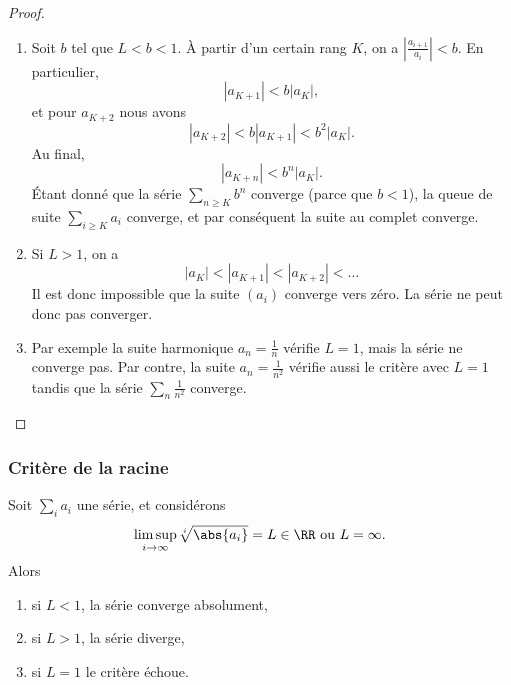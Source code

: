 \begin{proof}
\begin{enumerate}
	\item
		Soit $b$ tel que $L<b<1$. À partir d'un certain rang $K$, on a $\left| \frac{ a_{i+1} }{ a_i } \right| <b$. En particulier,
		\begin{equation}
			| a_{K+1} |<b| a_K |,
		\end{equation}
		et pour $a_{K+2}$ nous avons
		\begin{equation}
			| a_{K+2} |<b| a_{K+1} |<b^2| a_K |.
		\end{equation}
		Au final,
		\begin{equation}
			| a_{K+n} |<b^n| a_K |.
		\end{equation}
		Étant donné que la série $\sum_{n\geq K}b^n$ converge (parce que $b<1$), la queue de suite $\sum_{i\geq K}a_i$ converge, et par conséquent la suite au complet converge.
	\item
		Si $L>1$, on a
		\begin{equation}
			| a_K |<| a_{K+1} |<| a_{K+2} |<\ldots
		\end{equation}
		Il est donc impossible que la suite $(a_i)$ converge vers zéro. La série ne peut donc pas converger.
	\item
		Par exemple la suite harmonique $a_n=\frac{1}{ n }$ vérifie $L=1$, mais la série ne converge pas. Par contre, la suite $a_n=\frac{ 1 }{ n^2 }$ vérifie aussi le critère avec $L=1$ tandis que la série $\sum_n\frac{1}{ n^2 }$ converge.
\end{enumerate}
\end{proof}

\subsubsection{Critère de la racine}

\begin{proposition}
    Soit $\sum_i a_i$ une série, et considérons
    \begin{equation*}
      \limsup_{i \rightarrow \infty} \sqrt[i]{\abs{a_i}} = L \in \RR
      \text{ ou $L =
        \infty$.}
    \end{equation*}
    Alors
    \begin{enumerate}
    \item si $L < 1$, la série converge absolument,
    \item si $L> 1$, la série diverge,
    \item si $L = 1$ le critère échoue.
    \end{enumerate}
\end{proposition}

